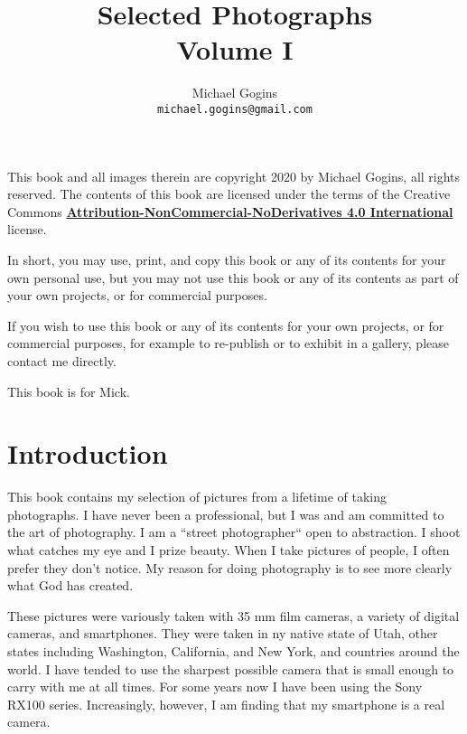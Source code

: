 \documentclass[10pt,letter,oneside]{book}
\begin{document}
\frontmatter
\onecolumn

\title{Selected Photographs \\ Volume I}
\author{Michael Gogins \\ \texttt{michael.gogins@gmail.com}}

\maketitle

\clearpage
\noindent This book and all images therein are copyright 2020 by Michael Gogins, all rights reserved. The contents of this book are licensed under the terms of the Creative Commons \href{https://creativecommons.org/licenses/by-nc-nd/4.0/legalcode}{\textbf{Attribution-NonCommercial-NoDerivatives 4.0 International} } license. 

In short, you may use, print, and copy this book or any of its contents for your own personal use, but you may not use this book or any of its contents as part of your own projects, or for commercial purposes.

If you wish to use this book or any of its contents for your own projects, or for commercial purposes, for example to re-publish or to exhibit in a gallery, please contact me directly.

\clearpage
\begin{centering}
This book is for Mick.
\end{centering}

\tableofcontents

\mainmatter
\pagestyle{headings}
\twocolumn
\chapter{Introduction}

This book contains my selection of pictures from a lifetime of taking photographs. I have never been a professional, but I was and am committed to the art of photography. I am a ``street photographer`` open to abstraction. I shoot what catches my eye and I prize beauty. When I take pictures of people, I often prefer they don't notice. My reason for doing photography is to see more clearly what God has created.

These pictures were variously taken with 35 mm film cameras, a variety of digital cameras, and smartphones. They were taken in ny native state of Utah, other states including Washington, California, and New York, and countries around the world. I have tended to use the sharpest possible camera that is small enough to carry with me at all times. For some years now I have been using the Sony RX100 series. Increasingly, however, I am finding that my smartphone is a real camera.
\end{document}
